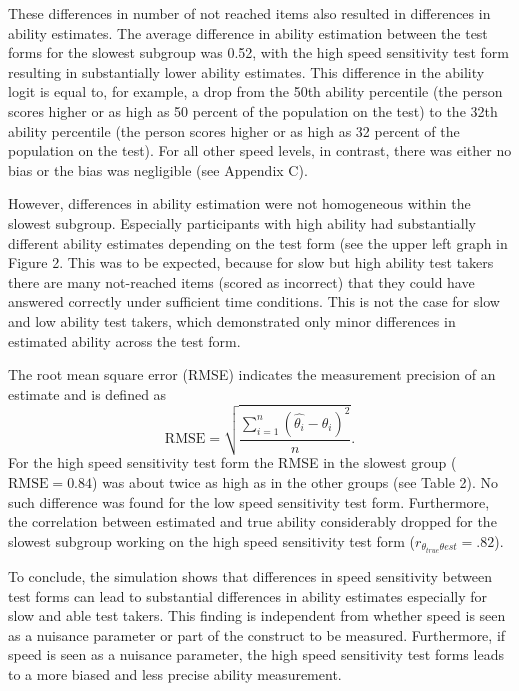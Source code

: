 \documentclass[a4paper,man,apacite,floatsintext,donotrepeattitle]{apa6}
\begin{document}
These differences in number of not reached items also resulted in differences in ability estimates. The average difference in ability estimation between the test forms for the slowest subgroup was 0.52, with the high speed sensitivity test form resulting in substantially lower ability estimates. This difference in the ability logit is equal to, for example, a drop from the 50th ability percentile (the person scores higher or as high as 50 percent of the population on the test) to the 32th ability percentile (the person scores higher or as high as 32 percent of the population on the test). For all other speed levels, in contrast, there was either no bias or the bias was negligible (see Appendix C). 

However, differences in ability estimation were not homogeneous within the slowest subgroup. Especially participants with high ability had substantially different ability estimates depending on the test form (see the upper left graph in Figure 2. This was to be expected, because for slow but high ability test takers there are many not-reached items (scored as incorrect) that they could have answered correctly under sufficient time conditions. This is not the case for slow and low ability test takers, which demonstrated only minor differences in estimated ability across the test form.

The root mean square error (RMSE) indicates the measurement precision of an estimate and is defined as 
\begin{equation}
	\textrm{RMSE} = \sqrt{\frac{\sum_{i = 1}^{n} (\widehat{\theta_i} - \theta_i)^2}{n}}.
\end{equation}
For the high speed sensitivity test form the RMSE in the slowest group ($\textrm{RMSE} = 0.84$) was about twice as high as in the other groups (see Table 2). No such difference was found for the low speed sensitivity test form. Furthermore, the correlation between estimated and true ability considerably dropped for the slowest subgroup working on the high speed sensitivity test form ($r_{\theta_{true} \theta{est}} = .82$).

To conclude, the simulation shows that differences in speed sensitivity between test forms can lead to substantial differences in ability estimates especially for slow and able test takers. This finding is independent from whether speed is seen as a nuisance parameter or part of the construct to be measured. Furthermore, if speed is seen as a nuisance parameter, the high speed sensitivity test forms leads to a more biased and less precise ability measurement. 
\end{document}
